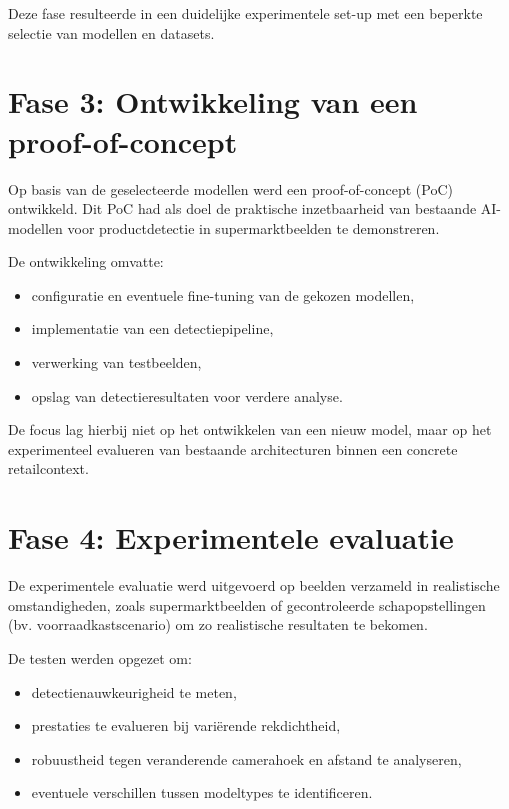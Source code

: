 Deze fase resulteerde in een duidelijke experimentele set-up met een beperkte selectie van modellen en datasets.

\section*{Fase 3: Ontwikkeling van een proof-of-concept}

Op basis van de geselecteerde modellen werd een proof-of-concept (PoC) ontwikkeld. Dit PoC had als doel de praktische inzetbaarheid van bestaande AI-modellen voor productdetectie in supermarktbeelden te demonstreren.

De ontwikkeling omvatte:

\begin{itemize}
    \item configuratie en eventuele fine-tuning van de gekozen modellen,
    \item implementatie van een detectiepipeline,
    \item verwerking van testbeelden,
    \item opslag van detectieresultaten voor verdere analyse.
\end{itemize}

De focus lag hierbij niet op het ontwikkelen van een nieuw model, maar op het experimenteel evalueren van bestaande architecturen binnen een concrete retailcontext.

\section*{Fase 4: Experimentele evaluatie}

De experimentele evaluatie werd uitgevoerd op beelden verzameld in realistische omstandigheden, zoals supermarktbeelden of gecontroleerde schapopstellingen (bv. voorraadkastscenario) om zo realistische resultaten te bekomen.

De testen werden opgezet om:

\begin{itemize}
    \item detectienauwkeurigheid te meten,
    \item prestaties te evalueren bij variërende rekdichtheid,
    \item robuustheid tegen veranderende camerahoek en afstand te analyseren,
    \item eventuele verschillen tussen modeltypes te identificeren.
\end{itemize}

